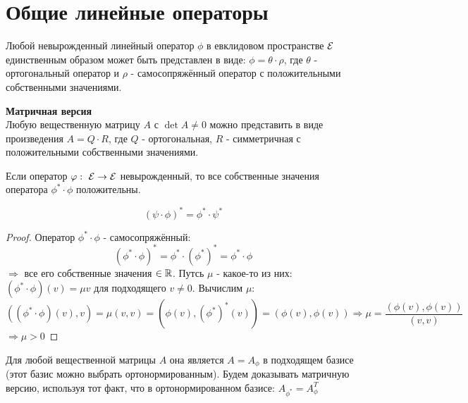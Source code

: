 \section{Общие линейные операторы}
\begin{theorem}
    Любой невырожденный линейный оператор $\phi$ в евклидовом пространстве $\mathcal{E}$ единственным образом может быть представлен в виде: $\phi = \theta \cdot \rho$, где $\theta$ - ортогональный оператор и $\rho$ - самосопряжённый оператор с положительными собственными значениями. 
\end{theorem}
\begin{theorem} \textbf{Матричная версия}\\
    Любую вещественную матрицу $A$ с $\det A \neq 0$ можно представить в виде произведения $A = Q \cdot R$, где $Q$ - ортогональная, $R$ - симметричная с положительными собственными значениями.      
\end{theorem}
\begin{lemma}
    Если оператор $\varphi: \ \mathcal{E} \to \mathcal{E}$ невырожденный, то все собственные значения оператора $\phi^* \cdot \phi$ положительны.  
\end{lemma} 
\begin{subtheorem}
    $$(\psi \cdot \phi)^* = \phi^* \cdot \psi^*$$ 
\end{subtheorem} 
\begin{proof}
    Оператор $\phi^* \cdot \phi$ - самосопряжённый: 
    $$(\phi^* \cdot \phi)^* = \phi^* \cdot (\phi^*)^* = \phi^* \cdot \phi$$
    $\Longrightarrow $ все его собственные значения $\in \mathbb{R}$. Путсь $\mu$ - какое-то из них: $(\phi^* \cdot \phi)(v) = \mu v$ для подходящего $v \neq 0$. Вычислим $\mu$: 
    $$((\phi^* \cdot \phi)(v),v) = \mu(v,v) = (\phi(v),(\phi^*)^*(v)) = (\phi(v), \phi(v)) \Longrightarrow \mu = \frac{(\phi(v),\phi(v))}{(v,v)}$$
    $\Longrightarrow \mu>0$     
\end{proof} 
\begin{remark}
    Для любой вещественной матрицы $A$ она является $A = A_\phi$ в подходящем базисе (этот базис можно выбрать ортонормированным). Будем доказывать матричную версию, используя тот факт, что в ортонормированном базисе: $A_{\phi^*} = A_\phi^T$  
\end{remark}
